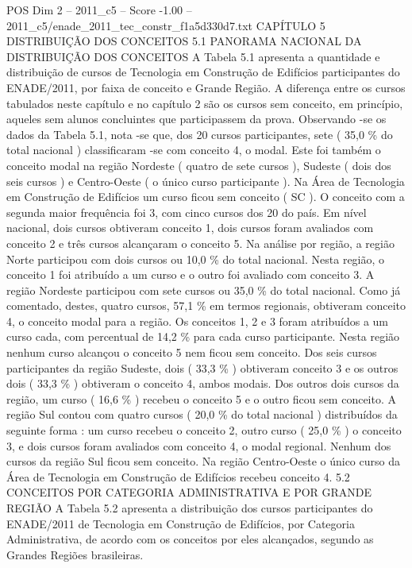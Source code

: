 \begin{textsample}{POS Dim 2 – 2011\_c5 – Score -1.00 – 2011\_c5/enade\_2011\_tec\_constr\_f1a5d330d7.txt}  \label{ex:f2_pos_351}
CAPÍTULO 5 DISTRIBUIÇÃO DOS CONCEITOS 5.1 PANORAMA NACIONAL DA DISTRIBUIÇÃO DOS CONCEITOS A Tabela 5.1 apresenta a quantidade e distribuição de cursos de Tecnologia em Construção de Edifícios participantes do ENADE/2011, por faixa de conceito e Grande Região.
A diferença entre os cursos tabulados neste capítulo e no capítulo 2 são os cursos sem conceito, em princípio, aqueles sem alunos concluintes que participassem da prova.
Observando -se os dados da Tabela 5.1, nota -se que, dos 20 cursos participantes, sete ( 35,0 \% do total nacional ) classificaram -se com conceito 4, o modal.
Este foi também o conceito modal na região Nordeste ( quatro de sete cursos ), Sudeste ( dois dos seis cursos ) e Centro-Oeste ( o único curso participante ).
Na Área de Tecnologia em Construção de Edifícios um curso ficou sem conceito ( SC ).
O conceito com a segunda maior frequência foi 3, com cinco cursos dos 20 do país.
Em nível nacional, dois cursos obtiveram conceito 1, dois cursos foram avaliados com conceito 2 e três cursos alcançaram o conceito 5.
Na análise por região, a região Norte participou com dois cursos ou 10,0 \% do total nacional.
Nesta região, o conceito 1 foi atribuído a um curso e o outro foi avaliado com conceito 3.
A região Nordeste participou com sete cursos ou 35,0 \% do total nacional.
Como já comentado, destes, quatro cursos, 57,1 \% em termos regionais, obtiveram conceito 4, o conceito modal para a região.
Os conceitos 1, 2 e 3 foram atribuídos a um curso cada, com percentual de 14,2 \% para cada curso participante.
Nesta região nenhum curso alcançou o conceito 5 nem ficou sem conceito.
Dos seis cursos participantes da região Sudeste, dois ( 33,3 \% ) obtiveram conceito 3 e os outros dois ( 33,3 \% ) obtiveram o conceito 4, ambos modais.
Dos outros dois cursos da região, um curso ( 16,6 \% ) recebeu o conceito 5 e o outro ficou sem conceito.
A região Sul contou com quatro cursos ( 20,0 \% do total nacional ) distribuídos da seguinte forma : um curso recebeu o conceito 2, outro curso ( 25,0 \% ) o conceito 3, e dois cursos foram avaliados com conceito 4, o modal regional.
Nenhum dos cursos da região Sul ficou sem conceito.
Na região Centro-Oeste o único curso da Área de Tecnologia em Construção de Edifícios recebeu conceito 4. 5.2 CONCEITOS POR CATEGORIA ADMINISTRATIVA E POR GRANDE REGIÃO A Tabela 5.2 apresenta a distribuição dos cursos participantes do ENADE/2011 de Tecnologia em Construção de Edifícios, por Categoria Administrativa, de acordo com os conceitos por eles alcançados, segundo as Grandes Regiões brasileiras.

\end{textsample}
